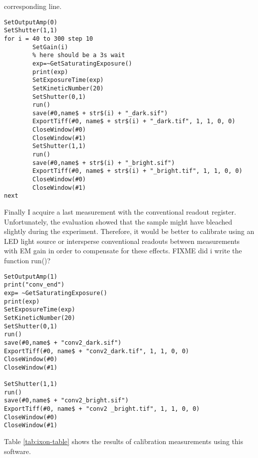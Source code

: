 corresponding line.
\begin{lstlisting}[style=mybasic]
SetOutputAmp(0)
SetShutter(1,1)
for i = 40 to 300 step 10
        SetGain(i)
        % here should be a 3s wait
        exp=~GetSaturatingExposure()
        print(exp)
        SetExposureTime(exp)
        SetKineticNumber(20)
        SetShutter(0,1)
        run()
        save(#0,name$ + str$(i) + "_dark.sif")
        ExportTiff(#0, name$ + str$(i) + "_dark.tif", 1, 1, 0, 0)
        CloseWindow(#0)
        CloseWindow(#1)
        SetShutter(1,1)
        run()
        save(#0,name$ + str$(i) + "_bright.sif")
        ExportTiff(#0, name$ + str$(i) + "_bright.tif", 1, 1, 0, 0)
        CloseWindow(#0)
        CloseWindow(#1)
next
\end{lstlisting}
Finally I acquire a last measurement with the conventional readout
register. Unfortunately, the evaluation showed that the sample might
have bleached slightly during the experiment. Therefore, it would be
better to calibrate using an LED light source or intersperse
conventional readouts between measurements with EM gain in order to
compensate for these effects. FIXME did i write the function run()?
\begin{lstlisting}[style=mybasic]
SetOutputAmp(1)
print("conv_end")
exp= ~GetSaturatingExposure()
print(exp)
SetExposureTime(exp)
SetKineticNumber(20)
SetShutter(0,1)
run()
save(#0,name$ + "conv2_dark.sif")
ExportTiff(#0, name$ + "conv2_dark.tif", 1, 1, 0, 0)
CloseWindow(#0)
CloseWindow(#1)
        
SetShutter(1,1)
run()
save(#0,name$ + "conv2_bright.sif")
ExportTiff(#0, name$ + "conv2 _bright.tif", 1, 1, 0, 0)
CloseWindow(#0)
CloseWindow(#1)
\end{lstlisting}
Table \ref{tab:ixon-table} shows the results of calibration
measurements using this software.



